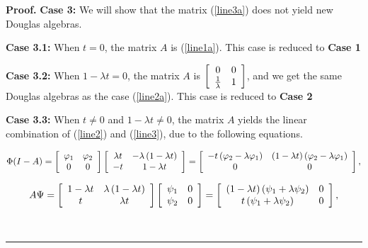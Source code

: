 \documentclass[10pt,a4paper]{amsart}
\newenvironment{proof}[1][Proof]{\noindent\textbf{#1.} }{\ \rule{0.5em}{0.5em}}
\begin{document}
\begin{proof}
\textbf{{Case 3:}} We will show that the matrix (\ref{line3a}) does not yield
new Douglas algebras.

\textbf{{Case 3.1:}} When $t=0$, the matrix $A$ is (\ref{line1a}). This case
is reduced to \textbf{{Case 1}}

\textbf{{Case 3.2:}} When $1-\lambda t=0$, the matrix $A$ is $\left[
\begin{array}
[c]{cc}%
0 & 0\\
\frac{1}{\lambda} & 1
\end{array}
\right]  $, and we get the same Douglas algebras as the case (\ref{line2a}).
This case is reduced to \textbf{{Case 2}}

\textbf{{Case 3.3:}} When $t\neq0$ and $1-\lambda t\neq0$, the matrix $A$
yields the linear combination of (\ref{line2}) and (\ref{line3}), due to the
following equations.%

\begin{align}
\Phi(I-A)=\left[
\begin{array}
[c]{cc}%
\varphi_{1} & \varphi_{2}\\
0 & 0
\end{array}
\right]  \left[
\begin{array}
[c]{cc}%
\lambda t & -\lambda\left(  1-\lambda t\right) \\
-t & 1-\lambda t
\end{array}
\right]  =\left[
\begin{array}
[c]{cc}%
-t\left(  \varphi_{2}-\lambda\varphi_{1}\right)  & \left(  1-\lambda t\right)
\left(  \varphi_{2}-\lambda\varphi_{1}\right) \\
0 & 0
\end{array}
\right]  ,\nonumber
\end{align}
%

\begin{align}
A\Psi= \left[
\begin{array}
[c]{cc}%
1-\lambda t & \lambda\left(  1-\lambda t\right) \\
t & \lambda t
\end{array}
\right]  \left[
\begin{array}
[c]{cc}%
\psi_{1} & 0\\
\psi_{2} & 0
\end{array}
\right]  =\left[
\begin{array}
[c]{cc}%
\left(  1-\lambda t\right)  \left(  \psi_{1}+\lambda\psi_{2}\right)  & 0\\
t\left(  \psi_{1}+\lambda\psi_{2}\right)  & 0
\end{array}
\right]  ,\nonumber
\end{align}
%


\end{proof}
\end{document}
